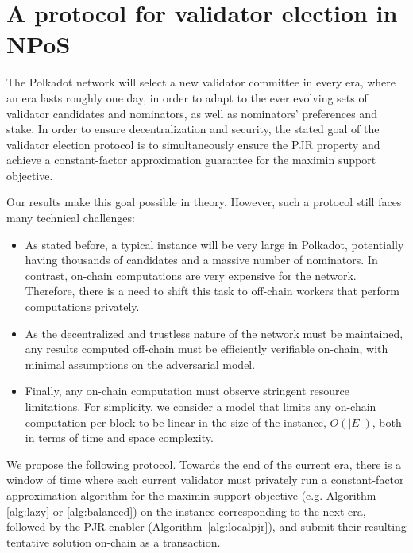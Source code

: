 
\section{A protocol for validator election in NPoS}\label{s:objectives}

The Polkadot network will select a new validator committee in every era, where an era lasts roughly one day, in order to adapt to the ever evolving sets of validator candidates and nominators, as well as nominators' preferences and stake. 
In order to ensure decentralization and security, the stated goal of the validator election protocol is to simultaneously ensure the PJR property and achieve a constant-factor approximation guarantee for the maximin support objective. 

Our results make this goal possible in theory. However, such a protocol still faces many technical challenges:

\begin{itemize}
    \item As stated before, a typical instance will be very large in Polkadot, potentially having thousands of candidates and a massive number of nominators. In contrast, on-chain computations are very expensive for the network. Therefore, there is a need to shift this task to off-chain workers that perform computations privately. 
    \item As the decentralized and trustless nature of the network must be maintained, any results computed off-chain must be efficiently verifiable on-chain, with minimal assumptions on the adversarial model.
    \item Finally, any on-chain computation must observe stringent resource limitations. For simplicity, we consider a model that limits any on-chain computation per block to be linear in the size of the instance, $O(|E|)$, both in terms of time and space complexity.
\end{itemize}


We propose the following protocol. 
Towards the end of the current era, there is a window of time where each current validator must privately run a constant-factor approximation algorithm for the maximin support objective (e.g. Algorithm \ref{alg:lazy} or \ref{alg:balanced}) on the instance corresponding to the next era, followed by the PJR enabler (Algorithm~\ref{alg:localpjr}), and submit their resulting tentative solution on-chain as a transaction. 


